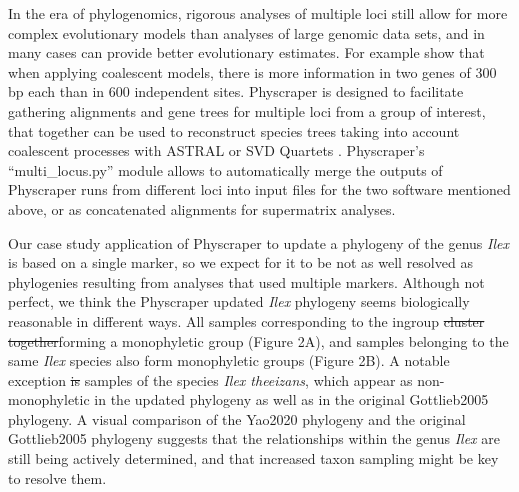 \documentclass{bmcart}
\providecommand{\DIFaddtex}[1]{{\protect\color{blue}\uwave{#1}}} %
\providecommand{\DIFdeltex}[1]{{\protect\color{red}\sout{#1}}}                      %
\providecommand{\DIFaddbegin}{} %
\providecommand{\DIFaddend}{} %
\providecommand{\DIFdelbegin}{} %
\providecommand{\DIFdelend}{} %
\providecommand{\DIFadd}[1]{\texorpdfstring{\DIFaddtex{#1}}{#1}} %
\providecommand{\DIFdel}[1]{\texorpdfstring{\DIFdeltex{#1}}{}} %
\begin{document}
In the era of phylogenomics, rigorous analyses of multiple loci still allow for
more complex evolutionary models
than analyses of large genomic data sets, and in many cases can provide better evolutionary estimates.
For example \cite{zhu_complexity_2021} show that when applying coalescent models,
there is more information in two genes of 300 bp each than in 600 independent sites.
Physcraper is designed to facilitate
gathering alignments and gene trees for multiple loci from a group of interest,
that together can be used to reconstruct species trees taking into account coalescent
processes with ASTRAL \cite{mirarab2014astral} or SVD Quartets \cite{chifman2014quartet}.
Physcraper's ``multi\_locus.py'' module allows to automatically
merge the outputs of Physcraper runs from different loci into input files for the
two software mentioned above, or as concatenated alignments for supermatrix analyses.


Our case study application of Physcraper to update a phylogeny of the genus \textit{Ilex} is based on a
single marker, so we expect for it to be not as well resolved as phylogenies resulting from analyses
that used multiple markers. Although not perfect,
we think the Physcraper updated \textit{Ilex} phylogeny seems biologically reasonable
in different ways. All samples
corresponding to the ingroup \DIFdelbegin \DIFdel{cluster together}\DIFdelend \DIFaddbegin \DIFadd{are clustered together, }\DIFaddend forming a monophyletic group (Figure 2A), and
samples belonging to the same \textit{Ilex} species also form
monophyletic groups (Figure 2B). A notable exception \DIFdelbegin \DIFdel{is }\DIFdelend \DIFaddbegin \DIFadd{are }\DIFaddend samples of the species \textit{Ilex theeizans}, which appear as
non-monophyletic in the updated phylogeny as well as in the original Gottlieb2005 phylogeny.
A visual comparison of the Yao2020 phylogeny and the original Gottlieb2005 phylogeny suggests
that the relationships within the genus \textit{Ilex} are still being actively
determined, and that increased taxon sampling might be key to resolve them.
\end{document}
